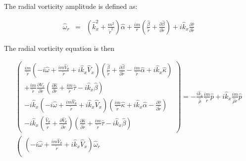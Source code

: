 \documentclass[12pt]{article}
\begin{document}
The radial vorticity amplitude is defined as:

\begin{eqnarray}
\widehat{\omega}_r
&=&
\left(\widehat{k}_x^2 + \frac{m^2}{\widetilde{r}^2} \right) \widehat{\alpha}
+
\frac{im}{r} 
\left(
\frac{\widehat{\beta}}{\widetilde{r}}
+\frac{\partial \widehat{\beta}}{\partial \widetilde{r}}
\right)
+i \widehat{k}_x 
\frac{\partial \widehat{\tau}}{\partial \widetilde{r}}
\nonumber
\end{eqnarray}

The radial vorticity equation is then

\begin{small}
\begin{eqnarray}
\left(
\begin{array}{r}
\frac{i m}{\widetilde{r}}
\left(
-i \widehat{\omega}
+ \frac{i m \widehat{V}_{\theta}}{\widetilde{r}}
+i \widehat{k}_x \widehat{V}_x 
\right) 
\left(
\frac{\widehat{\beta}}{\widetilde{r}}
+\frac{\partial \widehat{\beta}}{\partial \widetilde{r}}
-
\frac{i m}{\widetilde{r}}
\widehat{\alpha}
+ i \widehat{k}_x \widehat{\kappa}
\right) 
\\
+
\frac{i m}{\widetilde{r}}
\frac{\partial \widehat{V}_x}{\partial \widetilde{r}} 
\left(
\frac{\partial \widehat{\kappa}}{\partial \widetilde{r}}
+
\frac{i m}{\widetilde{r}}
\widehat{\tau}
-
i \widehat{k}_x \widehat{\beta}
\right) 
\\
-i \widehat{k}_x
\left(
-i \widehat{\omega} 
+ \frac{i m \widehat{V}_{\theta}}{\widetilde{r}}
+i \widehat{k}_x \widehat{V}_x 
\right) 
\left(
\frac{i m}{\widetilde{r}} \widehat{\kappa}
+
i \widehat{k}_x \widehat{\alpha}
-
\frac{\partial \widehat{\tau}}{\partial \widetilde{r}}
\right) 
\\
-i \widehat{k}_x
\left(
\frac{\widehat{V}_{\theta}}{\widetilde{r}}
+\frac{\partial \widehat{V}_{\theta}}{\partial \widetilde{r}}
\right) 
\left(
\frac{\partial \widehat{\kappa}}{\partial \widetilde{r}}
+
\frac{i m}{\widetilde{r}}
\widehat{\tau}
-
i \widehat{k}_x \widehat{\beta}
\right) 
\end{array}
\right)
 = 
-\frac{i \widehat{k}_x}{\widehat{\overline{\rho}}} 
\frac{i m}{\widetilde{r}}
\widehat{p}
+i \widehat{k}_x \frac{i m}{\widehat{\overline{\rho}} \widetilde{r}} \widehat{p}
\nonumber
\\
\left(
\begin{array}{r}
\left(
-i \widehat{\omega}
+ \frac{i m \widehat{V}_{\theta}}{\widetilde{r}}
+i \widehat{k}_x \widehat{V}_x 
\right) 
\widehat{\omega}_r
\\

\end{array}
\end{eqnarray}
\end{small}
\end{document}
